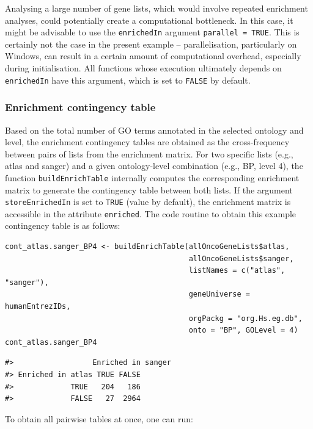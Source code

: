 Analysing a large number of gene lists, which would involve repeated enrichment analyses, could potentially create a computational bottleneck. In this case, it might be advisable to use the \texttt{enrichedIn} argument \texttt{parallel\ =\ TRUE}. This is certainly not the case in the present example -- parallelisation, particularly on Windows, can result in a certain amount of computational overhead, especially during initialisation. All functions whose execution ultimately depends on \texttt{enrichedIn} have this argument, which is set to \texttt{FALSE} by default.

\subsubsection{Enrichment contingency table}\label{enrichment-contingency-table}

Based on the total number of GO terms annotated in the selected ontology and level, the enrichment contingency tables are obtained as the cross-frequency between pairs of lists from the enrichment matrix. For two specific lists (e.g., atlas and sanger) and a given ontology-level combination (e.g., BP, level 4), the function \texttt{buildEnrichTable} internally computes the corresponding enrichment matrix to generate the contingency table between both lists. If the argument \texttt{storeEnrichedIn} is set to \texttt{TRUE} (value by default), the enrichment matrix is accessible in the attribute \texttt{enriched}. The code routine to obtain this example contingency table is as follows:

\begin{verbatim}
cont_atlas.sanger_BP4 <- buildEnrichTable(allOncoGeneLists$atlas, 
                                          allOncoGeneLists$sanger,
                                          listNames = c("atlas", "sanger"),
                                          geneUniverse = humanEntrezIDs, 
                                          orgPackg = "org.Hs.eg.db", 
                                          onto = "BP", GOLevel = 4)
cont_atlas.sanger_BP4
\end{verbatim}

\begin{verbatim}
#>                  Enriched in sanger
#> Enriched in atlas TRUE FALSE
#>             TRUE   204   186
#>             FALSE   27  2964
\end{verbatim}

To obtain all pairwise tables at once, one can run:

